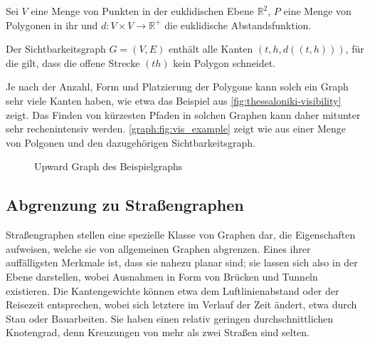 \begin{definition}[Sichtbarkeitsgraph]
    Sei $V$ eine Menge von Punkten in der euklidischen Ebene $\mathbb{R}^2$, $P$ eine Menge von Polygonen in ihr und $d \colon V \times V \to \mathbb{R}^+$ die euklidische Abstandsfunktion.

    Der Sichtbarkeitsgraph $G = (V, E)$ enthält alle Kanten $(t, h, d((t, h)))$, für die gilt, dass die offene Strecke $(t h)$ kein Polygon schneidet.
\end{definition}

Je nach der Anzahl, Form und Platzierung der Polygone kann solch ein Graph sehr viele Kanten haben, wie etwa das Beispiel aus \autoref{fig:thessaloniki-visibility} zeigt.
Das Finden von kürzesten Pfaden in solchen Graphen kann daher mitunter sehr rechenintensiv werden.
\autoref{graph:fig:vis_example} zeigt wie aus einer Menge von Polgonen und den dazugehörigen Sichtbarkeitsgraph.

\begin{figure}[ht]
    \centering
    \caption{Upward Graph des Beispielgraphs}
    \label{graph:fig:vis_example}
\end{figure}


\subsection{Abgrenzung zu Straßengraphen}\label{graphs:strassengraphen}

Straßengraphen stellen eine spezielle Klasse von Graphen dar, die Eigenschaften aufweisen, welche sie von allgemeinen Graphen abgrenzen.
Eines ihrer auffälligsten Merkmale ist, dass sie nahezu planar sind; sie lassen sich also in der Ebene darstellen, wobei Ausnahmen in Form von Brücken und Tunneln existieren.
Die Kantengewichte können etwa dem Luftlinienabstand oder der Reisezeit entsprechen, wobei sich letztere im Verlauf der Zeit ändert, etwa durch Stau oder Bauarbeiten.
Sie haben einen relativ geringen durchschnittlichen Knotengrad, denn Kreuzungen von mehr als zwei Straßen sind selten.

